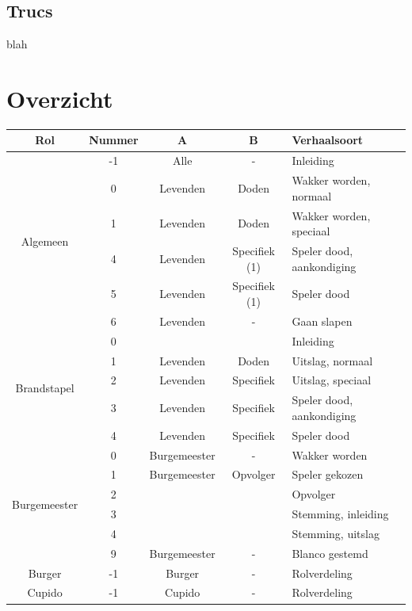 \documentclass[12pt]{article}
\begin{document}
  \subsection{Trucs}
    
      blah

\section{Overzicht}

  \begin{center}
    \begin{longtable}{c|c|c|c|l}
      Rol & Nummer & A & B &Verhaalsoort \\
      \hline
      \hline
      \multirow{6}{*}{Algemeen} & -1 & Alle & - & Inleiding \\
       & 0 & Levenden & Doden & Wakker worden, normaal \\
       & 1 & Levenden & Doden & Wakker worden, speciaal \\
       & 4 & Levenden & Specifiek (1) & Speler dood, aankondiging \\
       & 5 & Levenden & Specifiek (1) & Speler dood \\
       & 6 & Levenden & - & Gaan slapen \\
      \hline
      \multirow{5}{*}{Brandstapel} & 0 & & & Inleiding \\
       & 1 & Levenden & Doden & Uitslag, normaal \\
       & 2 & Levenden & Specifiek & Uitslag, speciaal \\
       & 3 & Levenden & Specifiek & Speler dood, aankondiging \\
       & 4 & Levenden & Specifiek & Speler dood \\
      \hline
      \multirow{6}{*}{Burgemeester} & 0 & Burgemeester & - & Wakker worden \\
       & 1 & Burgemeester & Opvolger & Speler gekozen \\
       & 2 & & & Opvolger \\
       & 3 & & & Stemming, inleiding \\
       & 4 & & & Stemming, uitslag \\
       & 9 & Burgemeester & - & Blanco gestemd \\
      \hline
      \multirow{1}{*}{Burger} & -1 & Burger & - & Rolverdeling \\
      \hline
      \multirow{8}{*}{Cupido} & -1 & Cupido & - & Rolverdeling \\

\end{longtable}
\end{center}
\end{document}
